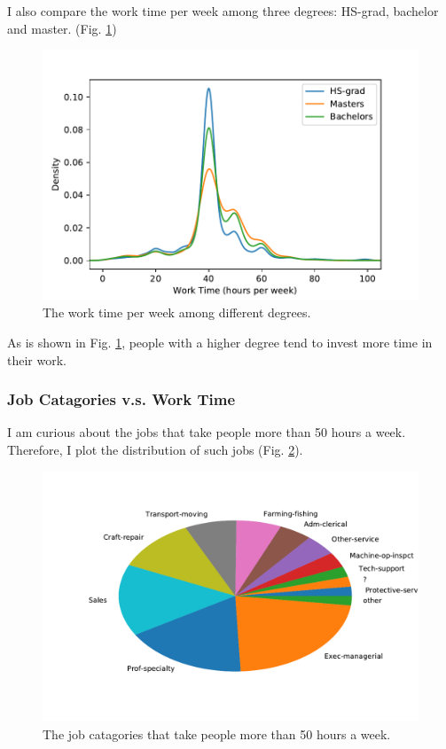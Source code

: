 \documentclass[12pt,a4paper]{article}
\theoremstyle{definition}
\begin{document}
I also compare the work time per week among three degrees: HS-grad, bachelor and master. (Fig. \ref{fig::worktime_vs})

\begin{figure}[H]
	\centering
	\includegraphics[width=0.75\linewidth]{img/work_time_com1.pdf}
	\caption{The work time per week among different degrees.}
	\label{fig::worktime_vs}
\end{figure}

As is shown in Fig. \ref{fig::worktime_vs}, people with a higher degree tend to invest more time in their work.

\subsubsection{Job Catagories v.s. Work Time}

I am curious about the jobs that take people more than 50 hours a week. Therefore, I plot the distribution of such jobs (Fig. \ref{fig::job}).

\begin{figure}[H]
	\centering
	\includegraphics[width=0.75\linewidth]{img/job_dis.pdf}
	\caption{The job catagories that take people more than 50 hours a week.}
	\label{fig::job}
\end{figure}
\end{document}
